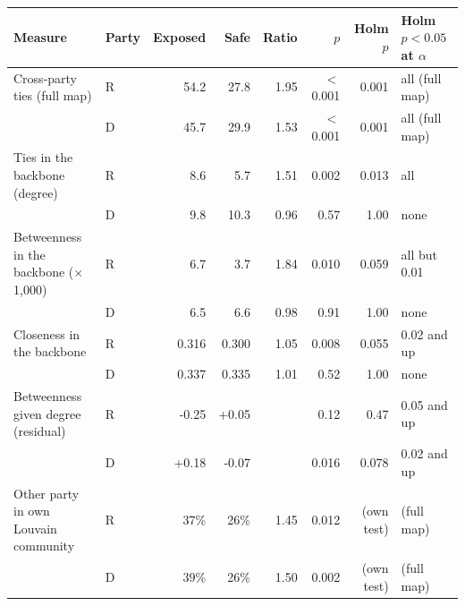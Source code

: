 \begin{tabular}{llrrrrrl}
\toprule
Measure & Party & Exposed & Safe & Ratio & $p$ & Holm $p$ & Holm $p<0.05$ at $\alpha$ \\
\midrule
Cross-party ties (full map) & R & 54.2 & 27.8 & 1.95 & $<$ 0.001 & 0.001 & all (full map) \\
 & D & 45.7 & 29.9 & 1.53 & $<$ 0.001 & 0.001 & all (full map) \\
Ties in the backbone (degree) & R & 8.6 & 5.7 & 1.51 & 0.002 & 0.013 & all \\
 & D & 9.8 & 10.3 & 0.96 & 0.57 & 1.00 & none \\
Betweenness in the backbone ($\times$1,000) & R & 6.7 & 3.7 & 1.84 & 0.010 & 0.059 & all but 0.01 \\
 & D & 6.5 & 6.6 & 0.98 & 0.91 & 1.00 & none \\
Closeness in the backbone & R & 0.316 & 0.300 & 1.05 & 0.008 & 0.055 & 0.02 and up \\
 & D & 0.337 & 0.335 & 1.01 & 0.52 & 1.00 & none \\
Betweenness given degree (residual) & R & -0.25 & +0.05 &  & 0.12 & 0.47 & 0.05 and up \\
 & D & +0.18 & -0.07 &  & 0.016 & 0.078 & 0.02 and up \\
Other party in own Louvain community & R & 37\% & 26\% & 1.45 & 0.012 & (own test) & (full map) \\
 & D & 39\% & 26\% & 1.50 & 0.002 & (own test) & (full map) \\
\bottomrule
\end{tabular}
